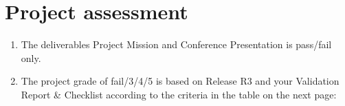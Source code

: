 \section{Project assessment}
\begin{enumerate}[noitemsep]
\item The deliverables Project Mission and Conference Presentation is pass/fail only.
\item The project grade of fail/3/4/5 is based on Release R3 and your Validation Report \& Checklist according to the criteria in the table on the next page:

\end{enumerate}

\newpage


